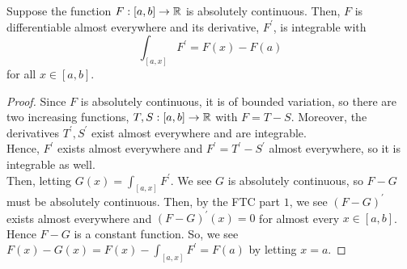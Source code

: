 \begin{theorem}
Suppose the function \(F: \left[ a, b \right]  \to \mathbb{R}\) is absolutely continuous. Then, \(F\) is differentiable almost everywhere and its derivative, \(F^{\prime}\), is integrable with \[
	\int_{\left[ a, x \right] }F^{\prime} = F\left( x \right) - F\left( a \right)
\] for all \(x \in \left[ a, b \right] \).
\end{theorem}
\begin{proof}
Since \(F\) is absolutely continuous, it is of bounded variation, so there are two increasing functions, \(T, S : \left[ a, b \right] \to \mathbb{R}\) 	with \(F = T - S\). Moreover, the derivatives \(T^{\prime}, S^{\prime}\) exist almost everywhere and are integrable.\\
Hence, \(F^{\prime}\) exists almost everywhere and \(F^{\prime} = T^{\prime} - S^{\prime}\) almost everywhere, so it is integrable as well.\\
Then, letting \(G\left( x \right) = \int_{\left[ a, x \right] } F^{\prime}\). We see \(G\) is absolutely continuous, so \(F - G\) must be absolutely continuous. Then, by the FTC part \(1\), we see \(\left( F - G \right) ^{\prime}\) exists almost everywhere and \(\left( F - G \right) ^{\prime}\left( x \right) = 0 \) for almost every \(x \in \left[ a, b \right] \). Hence \(F - G\) is a constant function. So, we see \(F\left( x \right) - G\left( x \right)  = F\left( x \right)  - \int_{\left[ a, x \right] }F^{\prime} = F\left( a \right) \) by letting \(x = a\).
\end{proof}

